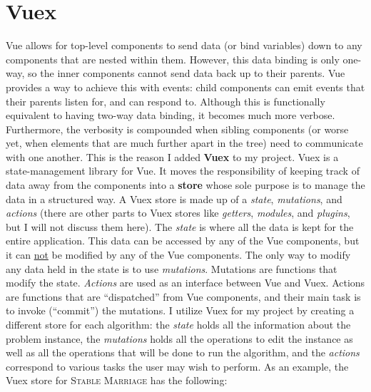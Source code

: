\section{Vuex}
\hspace{-0.26in}
Vue allows for top-level components to send data (or bind variables) down to any components that are 
nested within them. However, this data binding is only one-way, so the inner components
cannot send data back up to their parents. 
Vue provides a way to achieve this with events:
child components can emit events that their parents listen for, and can respond to.
Although this is functionally equivalent to having two-way data binding, it becomes much more verbose. 
Furthermore, the verbosity is compounded when sibling components 
(or worse yet, when elements that are much further apart in the tree)
need to communicate with one another. 
This is the reason I added \textbf{Vuex} \cite{vuex} to my project. 
\newline\newline
Vuex is a state-management library for Vue. It moves the responsibility of keeping track of 
data away from the components into a \textbf{store} whose sole purpose is to manage the data
in a structured way. A Vuex store is made up of a \textit{state}, \textit{mutations}, and \textit{actions} (there are other parts to Vuex stores like \textit{getters}, \textit{modules}, and \textit{plugins}, but I will not discuss them here).
\newline\newline
The \textit{state} is where all the data is kept for the entire application. 
This data can be accessed by any of the Vue components, 
but it can \underline{not} be modified by any of the Vue components. 
The only way to modify any data held in the state is to use \textit{mutations}. 
Mutations are functions that modify the state. 
\textit{Actions} are used as an interface between Vue and Vuex. 
Actions are functions that are ``dispatched'' from Vue components, 
and their main task is to invoke (``commit'') the mutations.
\newline\newline
I utilize Vuex for my project by creating a different store for each algorithm:
the \textit{state} holds all the information about the problem instance, 
the \textit{mutations} holds all the operations to edit the instance 
as well as all the operations that will be done to run the algorithm, 
and the \textit{actions} correspond to various tasks the user may wish to perform.
As an example, the Vuex store for \textsc{Stable Marriage} has the following: 
